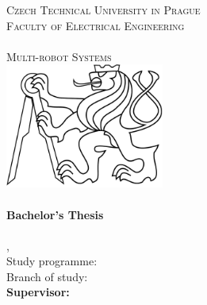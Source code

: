 
\begin{titlepage}
  \begin{center}

    \textsc{\Large Czech Technical University in Prague}\\[1em]
    \textsc{\large Faculty of Electrical Engineering\\
    \Department\\
    Multi-robot Systems\\[3em]
    }
    \includegraphics[height=4.1cm]{fig/ctu_lion.pdf}\\[3em]

    \textbf{\textsc{\Huge \Title}}\\[2em]

    \textbf{\Large Bachelor's Thesis}\\[3em]

    \textbf{\huge \Author}\\[3em]

    {\large \Location, \Date}\\[3em]

    Study programme: \Programme\\
    Branch of study: \Field\\[3em]

    \textbf{Supervisor: \Supervisor}\\

    \vspace{2pt}

  \end{center}
\end{titlepage}
